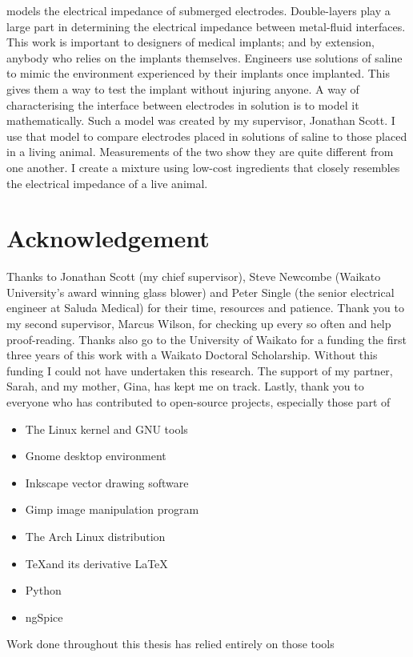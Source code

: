    models the electrical impedance of submerged electrodes.
  Double-layers play a large part in determining the electrical impedance between metal-fluid interfaces.
  This work is important to designers of medical implants; and by extension, anybody who relies on the implants themselves.
  Engineers use solutions of saline to mimic the environment experienced by their implants once implanted.
  This gives them a way to test the implant without injuring anyone.
  A way of characterising the interface between electrodes in solution is to model it mathematically.
  Such a model was created by my supervisor, Jonathan Scott.
  I use that model to compare electrodes placed in solutions of saline to those placed in a living animal.
  Measurements of the two show they are quite different from one another.
  I create a mixture using low-cost ingredients that closely resembles the electrical impedance of a live animal.


\chapter*{Acknowledgement}
Thanks to Jonathan Scott (my chief supervisor), Steve Newcombe (Waikato University's award winning glass blower) and Peter Single (the senior electrical engineer at Saluda Medical) for their time, resources and patience.
Thank you to my second supervisor, Marcus Wilson, for checking up every so often and help proof-reading.
Thanks also go to the University of Waikato for a funding the first three years of this work with a Waikato Doctoral Scholarship.
Without this funding I could not have undertaken this research.
The support of my partner, Sarah, and my mother, Gina, has kept me on track.
Lastly, thank you to everyone who has contributed to open-source projects, especially those part of
\begin{itemize}
\item The Linux kernel and GNU tools
\item Gnome desktop environment
\item Inkscape vector drawing software
\item Gimp image manipulation program
\item The Arch Linux distribution
\item \TeX \space and its derivative \LaTeX
\item Python
\item ngSpice
\end{itemize}
Work done throughout this thesis has relied entirely on those tools

